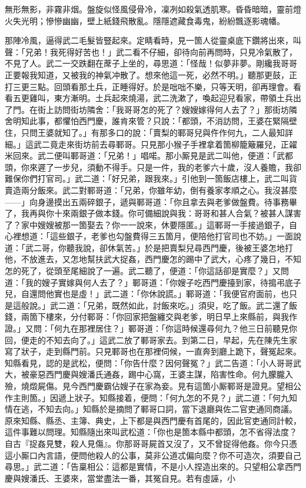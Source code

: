 \begin{myquote}
無形無影，非霧非烟。盤旋似怪風侵骨冷，凜冽如殺氣透肌寒。昏昏暗暗，靈前燈火失光明；慘慘幽幽，壁上紙錢飛散亂。隱隱遮藏食毒鬼，紛紛飄逐影魂幡。
\end{myquote}

那陣冷風，逼得武二毛髮皆豎起來。{}定睛看時，見一箇人從靈桌底下鑽將出來，叫聲：「兄弟！我死得好苦也！」武二看不仔細，卻待向前再問時，只見冷氣散了，不見了人。武二一交跌翻在蓆子上坐的，尋思道：「怪哉！似夢非夢。剛纔我哥哥正要報我知道，又被我的神氣冲散了。想來他這一死，必然不明。」聽那更鼓，正打三更三點。回頭看那土兵，正睡得好。於是咄咄不樂，只等天明，卻再理會。看看五更雞叫，東方漸明。土兵起來燒湯，武二洗漱了，喚起迎兒看家，帶領土兵出了門。在街上訪問街坊隣舍：「我哥哥怎的死了？嫂嫂嫁得何人去了？」那街坊隣舍明知此事，都懼怕西門慶，誰肯來管？只說：「都頭，不消訪問，王婆在緊隔壁住，只問王婆就知了。」有那多口的說：「賣梨的鄆哥兒與仵作何九，二人最知詳細。」這武二竟走來街坊前去尋鄆哥。只見那小猴子手裡拿着箇柳籠簸羅兒，正糴米回來。武二便叫鄆哥道：「兄弟！」唱喏。那小厮見是武二叫他，便道：「武都頭，你來遲了一步兒，須動不得手。只是一件，我的老爹六十歲，沒人養贍，我卻難保你們打官司。」{}武二道：「好兄弟，跟我來。」引他到一箇飯店樓上，武二叫貨賣造兩分飯來。武二對鄆哥道：「兄弟，你雖年幼，倒有養家孝順之心。我沒甚麼——」向身邊摸出五兩碎銀子，遞與鄆哥道：「你且拿去與老爹做盤費。待事務畢了，我再與你十來兩銀子做本錢。你可備細說與我：哥哥和甚人合氣？被甚人謀害了？家中嫂嫂被那一箇娶去？你一一說來，休要隱匿。」這鄆哥一手接過銀子，自心裡想道：「這些銀子，老爹也勾盤費得三五箇月，便陪他打官司也不妨。」一面說道：「武二哥，你聽我說，卻休氣苦。」於是把賣梨兒尋西門慶，後被王婆怎地打他，不放進去，又怎地幫扶武大捉姦，西門慶怎的踢中了武大，心疼了幾日，不知怎的死了，從頭至尾細說了一遍。武二聽了，便道：「你這話卻是實麼？」又問道：「我的嫂子實嫁與何人去了？」鄆哥道：「你嫂子吃西門慶擡到家，待搗弔底子兒，自還問他實也是虛！」武二道：「你休說謊。」鄆哥道：「我便官府面前，也只是這般說。」{}武二道：「兄弟，既然如此，討飯來吃。」須臾，吃了飯。武二還了飯錢，兩箇下樓來，分付鄆哥：「你回家把盤纏交與老爹，明日早上來縣前，與我作證。」又問：「何九在那裡居住？」鄆哥道：「你這時候還尋何九？他三日前聽見你回，便走的不知去向了。」{}這武二放了鄆哥家去。到第二日，早起，先在陳先生家寫了狀子，走到縣門前。只見鄆哥也在那裡伺候，一直奔到廳上跪下，聲冤起來。知縣看見，認的是武松，便問：「你告什麼？因何聲冤？」武二告道：「小人哥哥武大，被豪惡西門慶與嫂潘氏通姦，踢中心窩，王婆主謀，陷害性命。何九朦朧入殮，燒燬屍傷。見今西門慶霸佔嫂子在家為妾。見有這箇小厮鄆哥是證見。望相公作主則箇。」因遞上狀子。知縣接着，便問：「何九怎的不見？」武二道：「何九知情在逃，不知去向。」知縣於是摘問了鄆哥口詞，當下退廳與佐二官吏通同商議。原來知縣、縣丞、主簿、典史，上下都是與西門慶有首尾的，因此官吏通同計較，這件事難以問理。知縣隨出來叫武松道：「你也是箇本縣中都頭，怎不省得法度？自古『捉姦見雙，殺人見傷』。你那哥哥屍首又沒了，又不曾捉得他姦。你今只憑這小厮口內言語，便問他殺人的公事，莫非公道忒偏向麼？你不可造次，須要自己尋思。」武二道：「告稟相公：這都是實情，不是小人捏造出來的。只望相公拿西門慶與嫂潘氏、王婆來，當堂盡法一番，其冤自見。若有虛誣，小